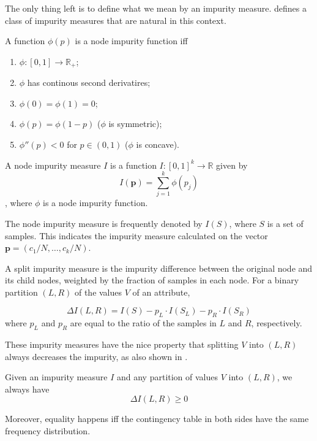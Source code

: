 The only thing left is to define what we mean by an impurity measure. \cite{Breiman84} defines a class of impurity measures that are natural in this context.

\begin{definition}

 A function $\phi(p)$ is a node impurity function iff 
 \begin{enumerate}
  \item $\phi: [0, 1] \rightarrow \mathbb{R}_+$;
  \item $\phi$ has continous second derivatires;
  \item $\phi(0) = \phi(1) = 0$;
  \item $\phi(p) = \phi(1-p)$ ($\phi$ is symmetric);
  \item $\phi''(p) < 0$ for $p \in (0, 1)$ ($\phi$ is concave).
 \end{enumerate}
\end{definition}


\begin{definition}

 A node impurity measure $I$ is a function $I: [0,1]^k \to \mathbb{R}$ given by
 $$I(\mathbf{p}) = \sum_{j=1}^{k}\phi(p_j)$$,
 where $\phi$ is a node impurity function.
 
 The node impurity measure is frequently denoted by $I(S)$, where $S$ is a set of samples. This indicates the impurity measure calculated on the vector $\mathbf{p} = (c_1/N, \ldots, c_k/N)$.
\end{definition}

\begin{definition}

A split impurity measure is the impurity difference between the original node and its child nodes, weighted by the fraction of samples in each node. For a binary partition $(L,R)$ of the values $V$ of an attribute,

$$\Delta I(L, R) = I(S) - p_L \cdot I(S_L) - p_R \cdot I(S_R)$$
where $p_L$ and $p_R$ are equal to the ratio of the samples in $L$ and $R$, respectively.
\end{definition}

These impurity measures have the nice property that splitting $V$ into $(L, R)$ always decreases the impurity, as also shown in \cite{Breiman84}.

\begin{theorem}
Given an impurity measure $I$ and any partition of values $V$ into $(L, R)$, we always have
$$\Delta I(L, R) \geq 0 $$

Moreover, equality happens iff the contingency table in both sides have the same frequency distribution.
\end{theorem}

